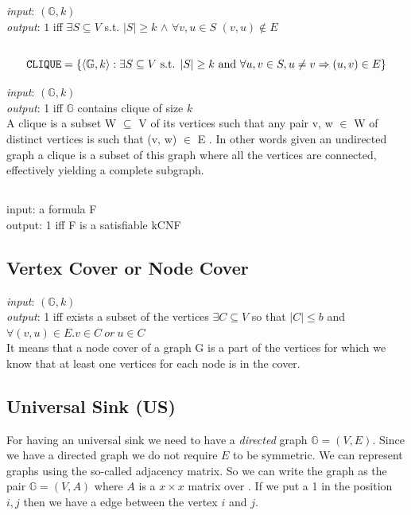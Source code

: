 \emph{input}: $(\mathbb{G},k)$\\
\emph{output}: $1$ iff \(\exists S \subseteq V\) s.t. \(|S|\geq k\) \(\land\) \(\forall v,u \in S\) \((v,u) \notin E\)


\subsection{\CLIQUE}
\[
	\CLIQUE = \{ \langle \mathbb{G}, k \rangle : \exists S \subseteq V \text{ s.t. } |S| \ge k \text{ and } \forall u,v \in S, u \neq v \implies (u,v) \in E \}
\]

\emph{input}: $(\mathbb{G},k)$\\
\emph{output}: 1 iff $\mathbb{G}$ contains clique of size $k$\\
A clique is a subset W \(\subseteq\) V of its vertices such that any pair v, w \(\in\) W  of distinct vertices is such that (v, w) \(\in\) E . In other words given an undirected graph a clique is a subset of this graph where all the vertices are connected, effectively yielding a complete subgraph.

\subsection{}
input: a formula F\\
output: 1 iff F is a satisfiable kCNF\\

\subsection{Vertex Cover or Node Cover}
\emph{input}: $(\mathbb{G},k)$\\
\emph{output}: 1 iff exists a subset of the vertices \(\exists C \subseteq V\) so that \(|C| \leq b\) and \(\forall (v,u) \in E. v\in C\ or\ u\in C\) \\
It means that a node cover of a graph G is a part of the vertices for which we know that at least one vertices for each node is in the cover.

\subsection{Universal Sink (US)}
For having an universal sink we need to have a \emph{directed} graph $\mathbb{G}=(V,E)$. Since we have a directed graph we do not require $E$ to be symmetric. We can represent graphs using the so-called adjacency matrix. So we can write the graph as the pair $\mathbb{G}=(V,A)$ where $A$ is a \(x \times x\) matrix over \binset. If we put a 1 in the position $i,j$ then we have a edge between the vertex $i$ and $j$.

